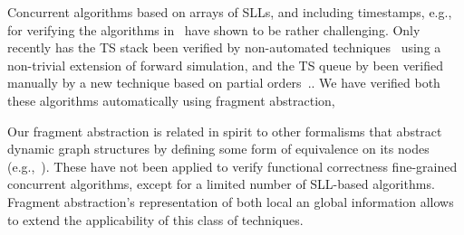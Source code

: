 Concurrent algorithms based on arrays of SLLs, and including timestamps, e.g.,
for verifying the algorithms in~\cite{ts-stack} have shown to be rather challenging. Only
recently has the TS stack been verified by non-automated
techniques~\cite{bouajjani:icalp17:rep} using a non-trivial extension of
forward simulation, and the TS queue by been verified manually by a new technique
based on partial orders~\cite{Khyzha:esop17,singh:issre16}..
We have verified both these algorithms automatically using fragment abstraction,

Our fragment abstraction is related in spirit to other formalisms that
abstract dynamic graph structures by defining some form of equivalence on
its nodes (e.g.,~\cite{spotlight07,Sagiv02,habermehl:forest}). These have
not been applied to verify functional correctness fine-grained concurrent
algorithms,  except for a limited number of SLL-based algorithms. Fragment
abstraction's representation of both local an global information allows to
extend the applicability of this class of techniques.



